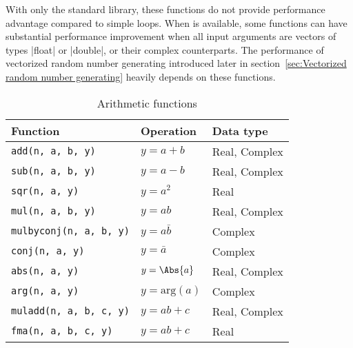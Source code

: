 With only the standard library, these functions do not provide performance
advantage compared to simple loops. When \mkl \vml is available, some functions
can have substantial performance improvement when all input arguments are
vectors of types |float| or |double|, or their complex counterparts. The
performance of vectorized random number generating introduced later in
section~\ref{sec:Vectorized random number generating} heavily depends on these
functions.

\begin{table}
  \begin{tabularx}{\textwidth}{LLL}
    \toprule
    Function & Operation & Data type \\
    \midrule
    \texttt{add(n, a, b, y)}       & $y = a + b$           & Real, Complex \\
    \texttt{sub(n, a, b, y)}       & $y = a - b$           & Real, Complex \\
    \texttt{sqr(n, a, y)}          & $y = a^2$             & Real          \\
    \texttt{mul(n, a, b, y)}       & $y = ab$              & Real, Complex \\
    \texttt{mulbyconj(n, a, b, y)} & $y = a\bar{b}$        & Complex       \\
    \texttt{conj(n, a, y)}         & $y = \bar{a}$         & Complex       \\
    \texttt{abs(n, a, y)}          & $y = \Abs{a}$         & Real, Complex \\
    \texttt{arg(n, a, y)}          & $y = \mathrm{arg}(a)$ & Complex       \\
    \texttt{muladd(n, a, b, c, y)} & $y = ab + c$          & Real, Complex \\
    \texttt{fma(n, a, b, c, y)}    & $y = ab + c$          & Real          \\
    \bottomrule
  \end{tabularx}
  \caption{Arithmetic functions}
  \label{tab:Arithmetic functions}
\end{table}

